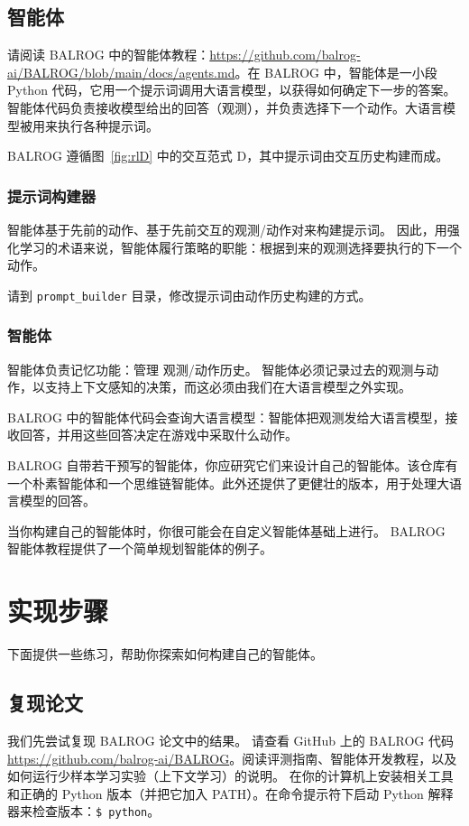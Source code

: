 \subsection{智能体}
请阅读 BALROG 中的智能体教程：\url{https://github.com/balrog-ai/BALROG/blob/main/docs/agents.md}。在 BALROG 中，智能体是一小段 Python 代码，它用一个提示词调用大语言模型，以获得如何确定下一步的答案。智能体代码负责接收模型给出的回答（观测），并负责选择下一个动作。大语言模型被用来执行各种提示词。

BALROG 遵循图~\ref{fig:rlD} 中的交互范式 D，其中提示词由交互历史构建而成。

\subsubsection{提示词构建器}
智能体基于先前的动作、基于先前交互的观测/动作对来构建提示词。
因此，用强化学习的术语来说，智能体履行策略的职能：根据到来的观测选择要执行的下一个动作。

请到 \verb|prompt_builder| 目录，修改提示词由动作历史构建的方式。

\subsubsection{智能体}
智能体负责记忆功能：管理
观测/动作历史。
智能体必须记录过去的观测与动作，以支持上下文感知的决策，而这必须由我们在大语言模型之外实现。

BALROG 中的智能体代码会查询大语言模型：智能体把观测发给大语言模型，接收回答，并用这些回答决定在游戏中采取什么动作。

BALROG 自带若干预写的智能体，你应研究它们来设计自己的智能体。该仓库有一个朴素智能体和一个思维链智能体。此外还提供了更健壮的版本，用于处理大语言模型的回答。

当你构建自己的智能体时，你很可能会在自定义智能体基础上进行。
BALROG 智能体教程提供了一个简单规划智能体的例子。


\section{实现步骤}
下面提供一些练习，帮助你探索如何构建自己的智能体。
\subsection{复现论文}

我们先尝试复现 BALROG 论文中的结果。
请查看 GitHub 上的 BALROG 代码 \url{https://github.com/balrog-ai/BALROG}。阅读评测指南、智能体开发教程，以及如何运行少样本学习实验（上下文学习）的说明。
在你的计算机上安装相关工具和正确的 Python 版本（并把它加入 PATH）。在命令提示符下启动 Python 解释器来检查版本：\verb|$ python|。

